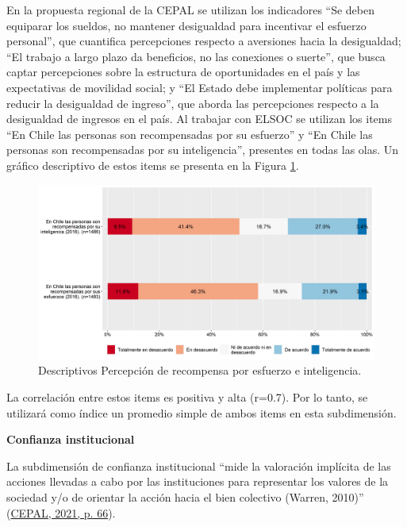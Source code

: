 \documentclass[
  12pt,
]{book}
\begin{document}
En la propuesta regional de la CEPAL se utilizan los indicadores ``Se deben equiparar los sueldos, no mantener desigualdad para incentivar el esfuerzo personal'', que cuantifica percepciones respecto a aversiones hacia la desigualdad; ``El trabajo a largo plazo da beneficios, no las conexiones o suerte'', que busca captar percepciones sobre la estructura de oportunidades en el país y las expectativas de movilidad social; y ``El Estado debe implementar políticas para reducir la desigualdad de ingreso'', que aborda las percepciones respecto a la desigualdad de ingresos en el país. Al trabajar con ELSOC se utilizan los items ``En Chile las personas son recompensadas por su esfuerzo'' y ``En Chile las personas son recompensadas por su inteligencia'', presentes en todas las olas. Un gráfico descriptivo de estos items se presenta en la Figura \ref{fig:justicia}.

\begin{figure}[H]

{\centering \includegraphics[width=1\linewidth,height=1\textheight]{output/graphs/justicia} 

}

\caption{Descriptivos Percepción de recompensa por esfuerzo e inteligencia.}\label{fig:justicia}
\end{figure}

La correlación entre estos items es positiva y alta (r=0.7). Por lo tanto, se utilizará como índice un promedio simple de ambos items en esta subdimensión.

\textbf{Confianza institucional}

La subdimensión de confianza institucional ``mide la valoración implícita de las acciones llevadas a cabo por las instituciones para representar los valores de la sociedad y/o de orientar la acción hacia el bien colectivo (Warren, 2010)'' (\protect\hyperlink{ref-cepal_cohesion_2021}{CEPAL, 2021, p. 66}).
\end{document}
